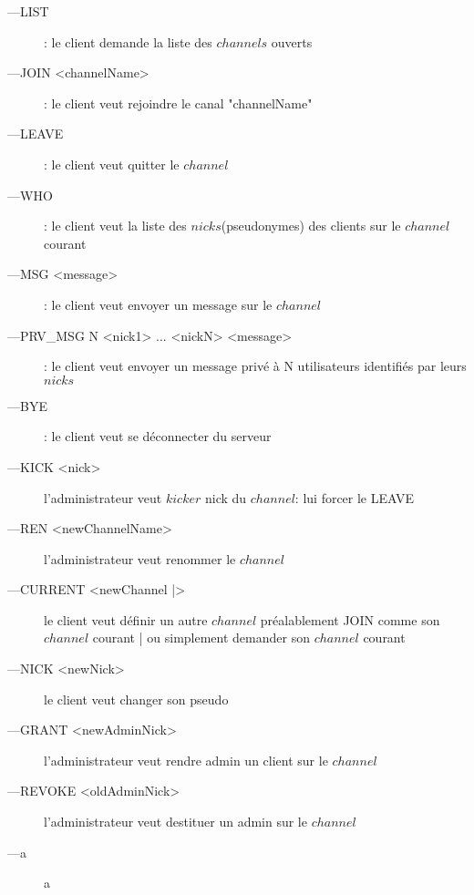 \documentclass[12pt]{article}
\begin{document}
\begin{description}
    \item[---LIST]: le client demande la liste des $channels$ ouverts
    \item[---JOIN <channelName>]: le client veut rejoindre le canal "channelName" 
    \item[---LEAVE]: le client veut quitter le $channel$
    \item[---WHO] : le client veut la liste des $nicks$(pseudonymes) des clients
    sur le $channel$ courant
    \item[---MSG <message>]: le client veut envoyer un message sur le $channel$
    \item[---PRV\_MSG N <nick1> ... <nickN> <message>]: le client veut
         envoyer un message privé à N utilisateurs identifiés par leurs $nicks$
    \item[---BYE]: le client veut se déconnecter du serveur
    \item[---KICK <nick>]  l'administrateur veut $kicker$ nick
    du $channel$: lui forcer le LEAVE
    \item[---REN <newChannelName>]  l'administrateur veut renommer le $channel$
    \item[---CURRENT <newChannel |>]  le client veut définir un autre
    $channel$ préalablement JOIN comme son $channel$ courant | ou simplement
    demander son $channel$ courant
    \item[---NICK <newNick>]  le client veut changer son pseudo
    \item[---GRANT <newAdminNick>]  l'administrateur veut rendre admin
                                                un client sur le $channel$ 
    \item[---REVOKE <oldAdminNick>]  l'administrateur veut destituer 
                                            un admin sur le $channel$
    \\
\end{description}



\begin{description}
    \item[---a] a
    \\
\end{description}


\end{document}

